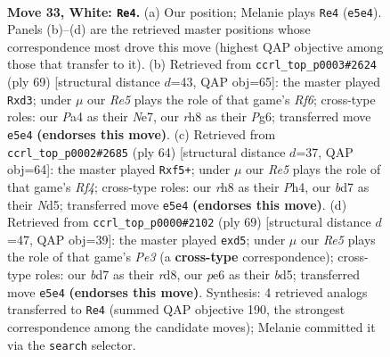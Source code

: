 \documentclass[11pt]{article}
\begin{document}
\clearpage

\begin{figure}[p]\centering
\begin{subfigure}{0.46\textwidth}\centering
\resizebox{\linewidth}{!}{%
\newchessgame
\chessboard[
  setfen={7r/3bk3/1p2p3/p3R3/P5r1/1PN3P1/5K2/R7 w - - 1 33},
  showmover=false,
  pgfstyle=straightmove, color=movearrow, markmove={e5-e4}
]}
\caption{}
\end{subfigure}\hfill
\begin{subfigure}{0.46\textwidth}\centering
\resizebox{\linewidth}{!}{%
\newchessgame
\chessboard[
  setfen={6k1/4n3/1p4p1/4p1Pp/1R2P3/3P1rPB/7K/8 b - - 0 35},
  showmover=false,
  pgfstyle=straightmove, color=movearrow, markmove={f3-d3}
]}
\caption{}
\end{subfigure}
\\[4pt]
\begin{subfigure}{0.46\textwidth}\centering
\resizebox{\linewidth}{!}{%
\newchessgame
\chessboard[
  setfen={5b2/5k2/1p1p4/1PpNPp1p/5R1P/r5P1/6K1/8 w - - 2 33},
  showmover=false,
  pgfstyle=straightmove, color=movearrow, markmove={f4-f5}
]}
\caption{}
\end{subfigure}\hfill
\begin{subfigure}{0.46\textwidth}\centering
\resizebox{\linewidth}{!}{%
\newchessgame
\chessboard[
  setfen={3R4/5pk1/p3p3/3B4/PP4pP/2r5/3r1PKP/4R3 b - - 0 35},
  showmover=false,
  pgfstyle=straightmove, color=movearrow, markmove={e6-d5}
]}
\caption{}
\end{subfigure}
\caption{\textbf{Move 33, White: \texttt{Re4}.} (a) Our position; Melanie plays \texttt{Re4} (\texttt{e5e4}). Panels (b)--(d) are the retrieved master positions whose correspondence most drove this move (highest QAP objective among those that transfer to it). (b) Retrieved from \texttt{ccrl\_top\_p0003\#2624} (ply 69) [structural distance $d$=43, QAP obj=65]: the master played \texttt{Rxd3}; under $\mu$ our \emph{Re5} plays the role of that game's \emph{Rf6}; cross-type roles: our \emph{P}a4 as their \emph{N}e7, our \emph{r}h8 as their \emph{P}g6; transferred move \texttt{e5e4} \textbf{(endorses this move)}. (c) Retrieved from \texttt{ccrl\_top\_p0002\#2685} (ply 64) [structural distance $d$=37, QAP obj=64]: the master played \texttt{Rxf5+}; under $\mu$ our \emph{Re5} plays the role of that game's \emph{Rf4}; cross-type roles: our \emph{r}h8 as their \emph{P}h4, our \emph{b}d7 as their \emph{N}d5; transferred move \texttt{e5e4} \textbf{(endorses this move)}. (d) Retrieved from \texttt{ccrl\_top\_p0000\#2102} (ply 69) [structural distance $d$=47, QAP obj=39]: the master played \texttt{exd5}; under $\mu$ our \emph{Re5} plays the role of that game's \emph{Pe3} (a \textbf{cross-type} correspondence); cross-type roles: our \emph{b}d7 as their \emph{r}d8, our \emph{p}e6 as their \emph{b}d5; transferred move \texttt{e5e4} \textbf{(endorses this move)}. Synthesis: 4 retrieved analogs transferred to \texttt{Re4} (summed QAP objective 190, the strongest correspondence among the candidate moves); Melanie committed it via the \texttt{search} selector.}
\label{fig:thought-m64}
\end{figure}
\end{document}
